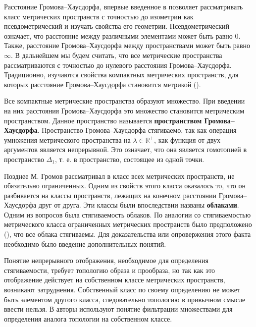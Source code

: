 Расстояние Громова--Хаусдорфа, впервые введенное в \cite{Edwards} позволяет
рассматривать класс метрических пространств с точностью до изометрии как
псевдометрический и изучать свойства его геометрии. Псевдометрический
означает, что расстояние между различными элементами может быть равно \( 0
\). Также, расстояние Громова--Хаусдорфа между пространствами может быть
равно \( \infty \). В дальнейшем мы будем считать, что все метрические
пространства рассматриваются с точностью до нулевого расстояния
Громова--Хаусдорфа. Традиционно, изучаются свойства компактных метрических
пространств, для которых расстояние Громова--Хаусдорфа становится метрикой
(\cite{gromov_structures_1981}).

Все компактные метрические пространства образуют множество. При введении на
них расстояния Громова--Хаусдорфа это множество становится метрическим
пространством. Данное пространство называется \textbf{пространством
Громова--Хаусдорфа}. Пространство Громова--Хаусдорфа стягиваемо, так как
операция умножения метрического пространства на \( \lambda \in
\mathbb{R}^+\), как функция от двух аргументов является непрерывной. Это
означает, что она является гомотопией в пространство \( \Delta _1 \), т. е. в
пространство, состоящее из одной точки.

Позднее М. Громов рассматривал в \cite{gromov_metric_2001} класс всех
метрических пространств, не обязательно ограниченных. Одним из свойств этого
класса оказалось то, что он разбивается на классы пространств, лежащих на
конечном расстоянии Громова--Хаусдорфа друг от друга. Эти классы были
впоследствии названы \textbf{облаками}. Одним из вопросов была стягиваемость
облаков. По аналогии со стягиваемостью метрического класса ограниченных
метрических пространств было предположено (\cite{gromov_structures_1981}),
что все облака стягиваемы. Для доказательства или опровержения этого факта
необходимо было введение дополнительных понятий.

Понятие непрерывного отображения, необходимое для определения стягиваемости,
требует топологию образа и прообраза, но так как это отображение действует на
собственном классе метрических пространств, возникают затруднения.
Собственный класс по своему определению не может быть элементом другого
класса, следовательно топологию в привычном смысле ввести нельзя. В
\cite{borzov_extendability_2020} авторы используют понятие фильтрации
множествами для определения аналога топологии на собственном классе.

